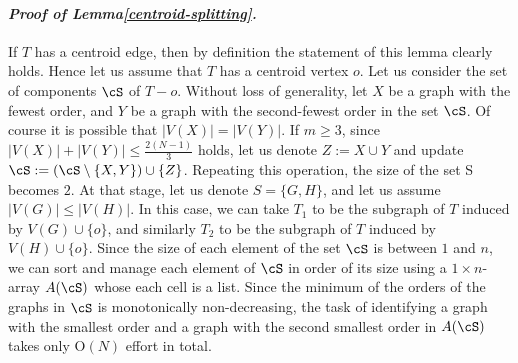\documentclass[letter,11pt]{article}
\newcommand{\white}{\qquad{\framebox{\rule{0pt}{4pt}}}}
\newcommand{\owari}{\hfill\white}
\theoremstyle{definition}
\theoremstyle{definition}
\newcommand{\1}{\boldmath$~1~$\unboldmath}
\newcommand{\Ord}{\mathrm{O}}
\newcommand{\qedgo}{\vspace{0.35cm}}
\newcommand{\tume}{\hspace*{0.2em}}
\newenvironment{Proofof}[1]{\expandafter
\paragraph{{\it Proof of #1.}}}{\hspace{5mm}\owari\qedgo}
\begin{document}
\begin{Proofof}{Lemma\tume\ref{centroid-splitting}}
If $T$ has a centroid edge, then by definition the statement of this lemma clearly holds.
Hence let us assume that $T$ has a centroid vertex $o$.
Let us consider the set of components $\cS$ of $T-o$. 
Without loss of generality, let $X$ be a graph with the fewest order, 
and $Y$ be a graph with the second-fewest order in the set $\cS$. 
Of course it is possible that $|V(X)|=|V(Y)|$. 
If $m \geq 3$, since $|V(X)|+|V(Y)| \leq \frac{2(N-1)}{3}$ holds, let us denote  
$Z:=X \cup Y$ and update $\cS:=(\cS \setminus \{X,Y\})\cup \{Z\}$. 
Repeating this operation, the size of the set S becomes $2$. 
At that stage, let us denote $S=\{G,H\}$, and let us assume $|V(G)|\leq |V(H)|$.
In this case, we can take $T_1$ to be the subgraph of $T$ induced by 
$V(G) \cup \{o\}$, and similarly $T_2$ to be the subgraph of $T$ induced by 
$V(H) \cup \{o\}$. 
Since the size of each element of the set $\cS$ is between $1$ and $n$, 
we can sort and manage each element of $\cS$ in order of its size using 
a $1\times n$-array $A(\cS)$ whose each cell is a list. 
Since the minimum of the orders of the graphs in $\cS$ is 
monotonically non-decreasing, the task of identifying a graph with 
the smallest order and a graph with the second smallest order in $A(\cS)$
takes only $\Ord(N)$ effort in total.
\end{Proofof}

\end{document}
